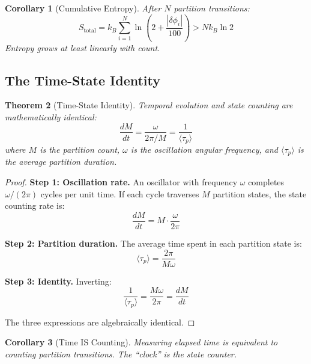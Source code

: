 \documentclass[twocolumn,10pt]{article}
\newtheorem{theorem}{Theorem}[section]
\newtheorem{corollary}[theorem]{Corollary}
\begin{document}
\begin{corollary}[Cumulative Entropy]
After $N$ partition transitions:
\begin{equation}
    S_{\text{total}} = k_B \sum_{i=1}^{N} \ln\left(2 + \frac{|\delta\phi_i|}{100}\right) > N k_B \ln 2
\end{equation}
Entropy grows at least linearly with count.
\end{corollary}

\subsection{The Time-State Identity}

\begin{theorem}[Time-State Identity]
\label{thm:time_state}
Temporal evolution and state counting are mathematically identical:
\begin{equation}
    \frac{dM}{dt} = \frac{\omega}{2\pi/M} = \frac{1}{\langle\tau_p\rangle}
\end{equation}
where $M$ is the partition count, $\omega$ is the oscillation angular frequency, and $\langle\tau_p\rangle$ is the average partition duration.
\end{theorem}

\begin{proof}
\textbf{Step 1: Oscillation rate.}
An oscillator with frequency $\omega$ completes $\omega/(2\pi)$ cycles per unit time. If each cycle traverses $M$ partition states, the state counting rate is:
\begin{equation}
    \frac{dM}{dt} = M \cdot \frac{\omega}{2\pi}
\end{equation}

\textbf{Step 2: Partition duration.}
The average time spent in each partition state is:
\begin{equation}
    \langle\tau_p\rangle = \frac{2\pi}{M\omega}
\end{equation}

\textbf{Step 3: Identity.}
Inverting:
\begin{equation}
    \frac{1}{\langle\tau_p\rangle} = \frac{M\omega}{2\pi} = \frac{dM}{dt}
\end{equation}

The three expressions are algebraically identical.
\end{proof}

\begin{corollary}[Time IS Counting]
Measuring elapsed time is equivalent to counting partition transitions. The ``clock'' is the state counter.
\end{corollary}
\end{document}
